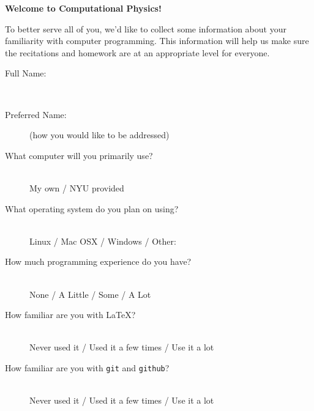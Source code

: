 \documentclass{article}
\begin{document}
\pagestyle{empty}

\begin{center}

\vspace*{-2.5cm}
\LARGE
\bf{Welcome to Computational Physics!}
\vspace{1cm}
\end{center}

\Large

To better serve all of you, we'd like to collect some information about your familiarity with computer programming.  This information will help us make sure the recitations and homework are at an appropriate level for everyone.  \\



\begin{description}

\item [Full Name:] \underline{\hspace{10cm}} \\

\item [Preferred Name:] \underline{\hspace{4.5cm}} (how you would like to be addressed) \\

\item [What computer will you primarily use?] \hfill \\
My own / NYU provided \\

\item  [What operating system do you plan on using?] \hfill \\
Linux / Mac OSX / Windows / Other:\underline{\hspace{3cm}} \\

\item [How much programming experience do you have?] \hfill \\
None / A Little / Some / A Lot \\
 
\item [How familiar are you with \LaTeX?] \hfill \\
Never used it / Used it a few times / Use it a lot \\

\item [How familiar are you with \texttt{git} and \texttt{github}?] \hfill \\
Never used it / Used it a few times / Use it a lot \\


\end{description}
\end{document}
